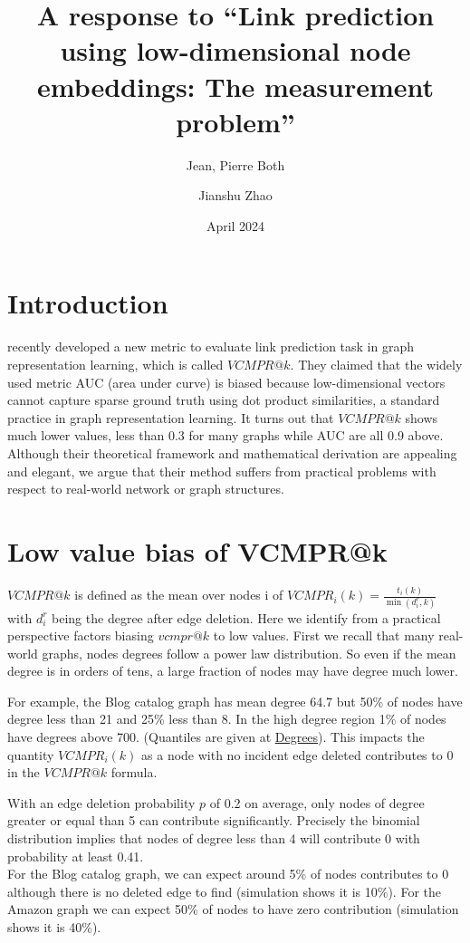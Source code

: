 \documentclass{article}
\title{A response to “Link prediction using low-dimensional node embeddings:
The measurement problem”}
\author[1,*]{Jean, Pierre Both}
\author[2]{Jianshu Zhao}
\affil[1]{Université Paris-Saclay, CEA, List, Palaiseau, France. (Retired)}
\affil[2]{Center for Bioinformatics and Computational Genomics, Georgia Institute of Technology, Atlanta, Georgia, USA}
\affil[*]{Corresponding author : jeanpierre.both@gmail.com}
\date{April 2024}
\begin{document}
\maketitle

\section{Introduction}

\citet{Menand} recently developed a new metric to evaluate link prediction task in graph representation learning, which is called $VCMPR@k$.
They claimed that the widely used metric AUC (area under curve) is biased because low-dimensional vectors cannot capture sparse ground truth using dot product similarities, a standard practice in graph representation learning.
It turns out that $VCMPR@k$ shows much lower values, less than 0.3 for many graphs while AUC are all 0.9 above. Although their theoretical framework and mathematical derivation are appealing and elegant, we argue that their method suffers from practical problems with respect to real-world network or graph structures.


\section{Low value bias of VCMPR@k}

$VCMPR@k$ is defined as the mean over nodes i of  $ VCMPR_{i}(k)= \frac{t_{i}(k)}{\min(d_{i}^{r},k)}$ with $ d_{i}^{r} $ being the degree after edge deletion.
Here we identify from a practical perspective factors biasing $vcmpr@k$ to low values.
First we recall that many real-world graphs, nodes degrees follow a power law distribution.
So even if the mean degree is in orders of tens, a large fraction of nodes may have degree much lower.

For example, the Blog catalog graph has mean degree 64.7 but 50\% of nodes have degree less than 21 and 25\% less than 8.
In the high degree region 1\% of nodes have degrees above 700. (Quantiles are given at  \href{https://github.com/jean-pierreBoth/linkauc/tree/master/Degrees}{\color{blue}Degrees}).
This impacts the quantity $ VCMPR_{i}(k)$ as a node with no incident edge deleted contributes to 0 in the $VCMPR@k$ formula.

With an edge deletion probability $p$ of 0.2 on average, only nodes of degree greater or equal than 5 can contribute significantly.
Precisely the binomial distribution implies that nodes of degree less than 4 will contribute 0 with probability at least 0.41. \\
For the Blog catalog graph, we can expect around 5\% of nodes contributes to 0 although there is no deleted edge to find (simulation shows it is 10\%).
For the Amazon graph we can expect 50\% of nodes to have zero contribution (simulation shows it is 40\%).
\end{document}
